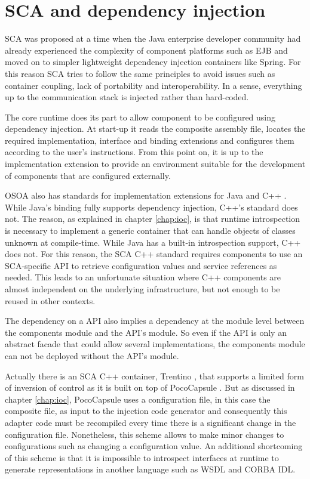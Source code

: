 \section{SCA and dependency injection}

SCA was proposed at a time when the Java enterprise developer community had already experienced the complexity of component
platforms such as EJB and moved on to simpler lightweight dependency injection containers like Spring. For this reason
SCA tries to follow the same principles to avoid issues such as container coupling, lack of portability and interoperability.
In a sense, everything up to the communication stack is injected rather than hard-coded.

The core runtime does its part to allow component to be configured using dependency injection. At start-up it reads the
composite assembly file, locates the required implementation, interface and binding extensions and configures them
according to the user's instructions. From this point on, it is up to the implementation extension to provide an environment
suitable for the development of components that are configured externally.

OSOA also has standards for implementation extensions for Java and C++ \cite{SCA}. While Java's binding fully supports
dependency injection, C++'s standard does not. The reason, as explained in chapter \ref{chap:ioc}, is that runtime
introspection is necessary to implement a generic container that can handle objects of classes unknown at compile-time.
While Java has a built-in introspection support, C++ does not. For this reason, the SCA C++ standard requires components
to use an SCA-specific API to retrieve configuration values and service references as needed. This leads to an unfortunate
situation where C++ components are almost independent on the underlying infrastructure, but not enough to be reused in
other contexts.

The dependency on a API also implies a dependency at the module level between the components module and the API's module.
So even if the API is only an abstract facade that could allow several implementations, the components module can not be deployed
without the API's module.

Actually there is an SCA C++ container, Trentino \cite{Trentino}, that supports a limited form of inversion of control as it is
built on top of PocoCapsule \cite{PocoCapsule}. But as discussed in chapter \ref{chap:ioc}, PocoCapsule uses a configuration
file, in this case the composite file, as input to the injection code generator and consequently this adapter code must be
recompiled every time there is a significant change in the configuration file. Nonetheless, this scheme allows to make minor
changes to configurations such as changing a configuration value. An additional shortcoming of this scheme is that
it is impossible to introspect interfaces at runtime to generate representations in another language such as WSDL and CORBA IDL.

